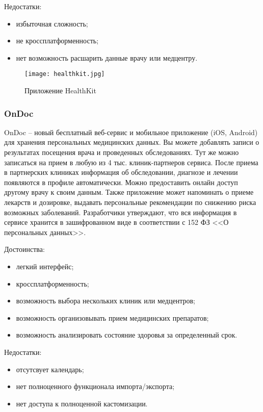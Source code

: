 Недостатки:
\begin{itemize}
  \item избыточная сложность;
  \item не кроссплатформенность;
  \item нет возможность расшарить данные врачу или медцентру.
\end{itemize}

\begin{figure}[ht]
\centering
  \texttt{[image: healthkit.jpg]}  
  \caption{ Приложение HealthKit }
  \label{fig:domain:manual_structure:credit_healthkit}
\end{figure}

\subsubsection{OnDoc}

OnDoc -- новый бесплатный веб-сервис и мобильное приложение (iOS, Android) для хранения персональных медицинских данных. Вы можете добавлять записи о результатах посещения врача и проведенных обследованиях. Тут же можно записаться на прием в любую из 4 тыс. клиник-партнеров сервиса. После приема в партнерских клиниках информация об обследовании, диагнозе и лечении появляются в профиле автоматически. Можно предоставить онлайн доступ другому врачу к своим данным. Также приложение может напоминать о приеме лекарств и дозировке, выдавать персональные рекомендации по снижению риска возможных заболеваний. Разработчики утверждают, что вся информация в сервисе хранится в зашифрованном виде в соответствии с 152 ФЗ <<О персональных данных>>. 

Достоинства:
\begin{itemize}
  \item легкий интерфейс;
  \item кроссплатформенность;
  \item возможность выбора нескольких клиник или медцентров;
  \item возможность организовывать прием медицинских препаратов;
  \item возможность анализировать состояние здоровья за определенный срок.
\end{itemize}

Недостатки:
\begin{itemize}
  \item отсутсвует календарь;
  \item нет полноценного функционала импорта/экспорта;
  \item нет доступа к полноценной кастомизации.
\end{itemize}



